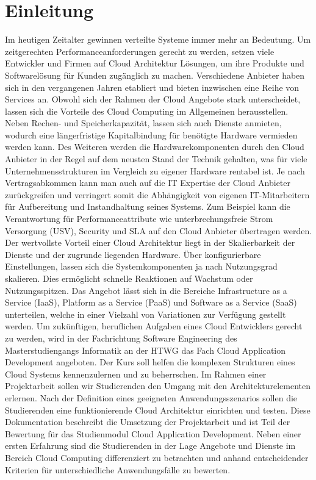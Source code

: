 \section{Einleitung}

Im heutigen Zeitalter gewinnen verteilte Systeme immer mehr an Bedeutung. Um zeitgerechten Performanceanforderungen gerecht zu werden,  setzen viele Entwickler und Firmen auf Cloud Architektur Lösungen, um ihre Produkte und Softwarelösung für Kunden zugänglich zu machen.
Verschiedene Anbieter haben sich in den vergangenen Jahren etabliert und bieten inzwischen eine Reihe von Services an. Obwohl sich der Rahmen der Cloud Angebote stark unterscheidet, lassen sich die Vorteile des Cloud Computing im Allgemeinen herausstellen. Neben Rechen- und Speicherkapazität, lassen sich auch Dienste anmieten, wodurch eine längerfristige Kapitalbindung für benötigte Hardware vermieden werden kann. Des Weiteren werden die Hardwarekomponenten durch den Cloud Anbieter in der Regel auf dem neusten Stand der Technik gehalten, was für viele Unternehmensstrukturen im Vergleich zu eigener Hardware rentabel ist.  Je nach Vertragsabkommen kann man auch auf die IT Expertise der Cloud Anbieter zurückgreifen und verringert somit die Abhängigkeit von eigenen IT-Mitarbeitern für Aufbereitung und Instandhaltung seines Systems. Zum Beispiel kann die Verantwortung für Performanceattribute wie unterbrechungsfreie Strom Versorgung (USV), Security und SLA auf den Cloud Anbieter übertragen werden.  Der wertvollste Vorteil einer Cloud Architektur liegt in der Skalierbarkeit der Dienste und der zugrunde liegenden Hardware. Über konfigurierbare Einstellungen, lassen sich die Systemkomponenten ja nach Nutzungsgrad skalieren. Dies ermöglicht schnelle Reaktionen auf Wachstum oder Nutzungsspitzen. Das Angebot lässt sich in die Bereiche Infrastructure as a Service (IaaS), Platform as a Service (PaaS) und Software as a Service  (SaaS) unterteilen, welche in einer Vielzahl von Variationen zur Verfügung gestellt werden.
Um zukünftigen, beruflichen Aufgaben eines Cloud Entwicklers gerecht zu werden, wird in der Fachrichtung Software Engineering des Masterstudiengangs Informatik an der HTWG das Fach Cloud Application Development angeboten. Der Kurs soll helfen die komplexen Strukturen eines Cloud Systems kennenzulernen und zu beherrschen. Im Rahmen einer Projektarbeit sollen wir Studierenden den Umgang mit den Architekturelementen erlernen. Nach der Definition eines geeigneten Anwendungsszenarios sollen die Studierenden eine funktionierende Cloud Architektur einrichten und testen.
Diese Dokumentation beschreibt die Umsetzung der Projektarbeit und ist Teil der Bewertung für das Studienmodul Cloud Application Development. Neben einer ersten Erfahrung sind die Studierenden in der Lage Angebote und Dienste im Bereich Cloud Computing differenziert zu betrachten und anhand entscheidender Kriterien für unterschiedliche Anwendungsfälle zu bewerten. 





